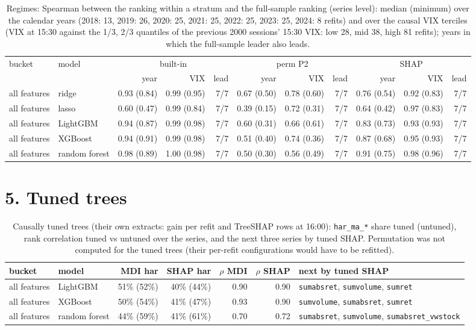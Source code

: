 \documentclass[10pt]{article}
\begin{document}
\begin{table}[H]\centering\scriptsize
\caption{Regimes: Spearman between the ranking within a stratum and the full-sample ranking (series level): median (minimum) over the calendar years (2018: 13, 2019: 26, 2020: 25, 2021: 25, 2022: 25, 2023: 25, 2024: 8 refits) and over the causal VIX terciles (VIX at 15:30 against the 1/3, 2/3 quantiles of the previous 2000 sessions' 15:30 VIX: low 28, mid 38, high 81 refits); years in which the full-sample leader also leads.}
\begin{tabular}{llrrrrrrrrr}\toprule
bucket & model & \multicolumn{3}{c}{built-in} & \multicolumn{3}{c}{perm P2} & \multicolumn{3}{c}{SHAP}\\ & & year & VIX & lead & year & VIX & lead & year & VIX & lead\\\midrule
all features & ridge & 0.93 (0.84) & 0.99 (0.95) & 7/7 & 0.67 (0.50) & 0.78 (0.60) & 7/7 & 0.76 (0.54) & 0.92 (0.83) & 7/7 \\
all features & lasso & 0.60 (0.47) & 0.99 (0.84) & 7/7 & 0.39 (0.15) & 0.72 (0.31) & 7/7 & 0.64 (0.42) & 0.97 (0.83) & 7/7 \\
all features & LightGBM & 0.94 (0.87) & 0.99 (0.98) & 7/7 & 0.60 (0.31) & 0.66 (0.61) & 7/7 & 0.83 (0.73) & 0.93 (0.93) & 7/7 \\
all features & XGBoost & 0.94 (0.91) & 0.99 (0.98) & 7/7 & 0.51 (0.40) & 0.74 (0.36) & 7/7 & 0.87 (0.68) & 0.95 (0.93) & 7/7 \\
all features & random forest & 0.98 (0.89) & 1.00 (0.98) & 7/7 & 0.50 (0.30) & 0.56 (0.49) & 7/7 & 0.91 (0.75) & 0.98 (0.96) & 7/7 \\
\bottomrule\end{tabular}\end{table}

\section*{5. Tuned trees}
\begin{table}[H]\centering\scriptsize
\caption{Causally tuned trees (their own extracts: gain per refit and TreeSHAP rows at 16:00): \texttt{har\_ma\_*} share tuned (untuned), rank correlation tuned vs untuned over the series, and the next three series by tuned SHAP. Permutation was not computed for the tuned trees (their per-refit configurations would have to be refitted).}
\begin{tabular}{llrrrrp{5cm}}\toprule
bucket & model & MDI har & SHAP har & $\rho$ MDI & $\rho$ SHAP & next by tuned SHAP\\\midrule
all features & LightGBM & 51\% (52\%) & 40\% (44\%) & 0.90 & 0.90 & \texttt{sumabsret}, \texttt{sumvolume}, \texttt{sumret} \\
all features & XGBoost & 50\% (54\%) & 41\% (47\%) & 0.93 & 0.90 & \texttt{sumvolume}, \texttt{sumabsret}, \texttt{sumret} \\
all features & random forest & 44\% (59\%) & 41\% (61\%) & 0.70 & 0.72 & \texttt{sumabsret}, \texttt{sumvolume}, \texttt{sumabsret\_vwstock} \\
\bottomrule\end{tabular}\end{table}
\end{document}
